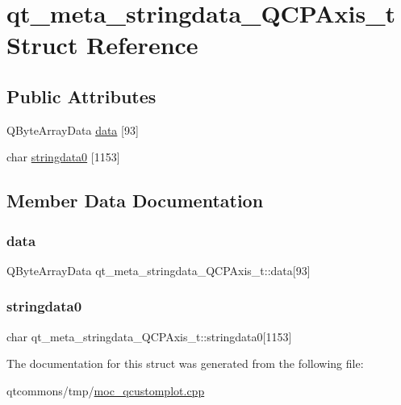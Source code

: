 \hypertarget{structqt__meta__stringdata___q_c_p_axis__t}{}\section{qt\+\_\+meta\+\_\+stringdata\+\_\+\+Q\+C\+P\+Axis\+\_\+t Struct Reference}
\label{structqt__meta__stringdata___q_c_p_axis__t}
\subsection*{Public Attributes}
\begin{DoxyCompactItemize}
\item 
Q\+Byte\+Array\+Data \mbox{\hyperlink{structqt__meta__stringdata___q_c_p_axis__t_ae011c62e737dac47326c984caba645e9}{data}} \mbox{[}93\mbox{]}
\item 
char \mbox{\hyperlink{structqt__meta__stringdata___q_c_p_axis__t_aaf59d59827c25b2c35a6fb7d0deed205}{stringdata0}} \mbox{[}1153\mbox{]}
\end{DoxyCompactItemize}


\subsection{Member Data Documentation}
\mbox{\label{structqt__meta__stringdata___q_c_p_axis__t_ae011c62e737dac47326c984caba645e9}} 
\subsubsection{\texorpdfstring{data}{data}}
{\footnotesize\ttfamily Q\+Byte\+Array\+Data qt\+\_\+meta\+\_\+stringdata\+\_\+\+Q\+C\+P\+Axis\+\_\+t\+::data\mbox{[}93\mbox{]}}

\mbox{\label{structqt__meta__stringdata___q_c_p_axis__t_aaf59d59827c25b2c35a6fb7d0deed205}} 
\subsubsection{\texorpdfstring{stringdata0}{stringdata0}}
{\footnotesize\ttfamily char qt\+\_\+meta\+\_\+stringdata\+\_\+\+Q\+C\+P\+Axis\+\_\+t\+::stringdata0\mbox{[}1153\mbox{]}}



The documentation for this struct was generated from the following file\+:\begin{DoxyCompactItemize}
\item 
qtcommons/tmp/\mbox{\hyperlink{moc__qcustomplot_8cpp}{moc\+\_\+qcustomplot.\+cpp}}\end{DoxyCompactItemize}
